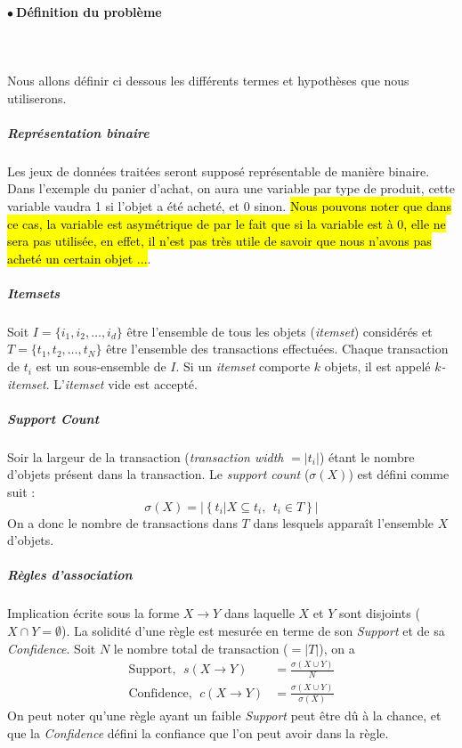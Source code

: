 \documentclass[letterpaper, 12pt]{article}
\newcommand{\alinea}{
\hspace*{0.5cm}}
\newcommand{\point}{$\bullet\ $}
\begin{document}
	\paragraph{\point Définition du problème}~\\~\\
		\alinea Nous allons définir ci dessous les différents
			termes et hypothèses que nous utiliserons.
		\subparagraph{Représentation binaire} Les jeux de données
			traitées seront supposé représentable de manière binaire.
			Dans l'exemple du panier d'achat, on aura une variable par
			type de produit, cette variable vaudra 1 si l'objet a été acheté,
			et 0 sinon. \hl{Nous pouvons noter que dans ce cas, la variable
			est asymétrique de par le fait que si la variable est à 0,
			elle ne sera pas utilisée, en effet, il n'est pas très utile 
			de savoir que nous n'avons pas acheté un certain objet ...}.
		\subparagraph{\textit{Itemsets}} Soit
			$I = \{i_1, i_2, \ldots, i_d\}$ être l'ensemble de tous 
			les objets (\textit{itemset}) considérés et 
			$T = \{t_1, t_2, \ldots, t_N\}$ être l'ensemble des transactions
			effectuées. Chaque transaction de $t_i$ est un sous-ensemble
			de $I$. Si un \textit{itemset} comporte $k$ objets, il est 
			appelé \textit{$k$-itemset}. L'\textit{itemset} vide est accepté.
		\subparagraph{\textit{Support Count}} Soir la largeur de la 
			transaction (\textit{transaction width} $= |t_i|$) étant le nombre
			d'objets présent dans la transaction. Le \textit{support count}
			($\sigma(X)$) est défini comme suit : 
			$$ \sigma(X) = |\left\lbrace t_i | X \subseteq t_i,\ \ t_i \in T
				\right\rbrace| $$
			On a donc le nombre de transactions dans $T$ dans lesquels
			apparaît l'ensemble $X$ d'objets.
		\subparagraph{Règles d'association} Implication écrite sous la forme
			$X \longrightarrow Y$ dans laquelle $X$ et $Y$ sont disjoints
			($X \cap Y = \emptyset$). La solidité d'une règle est
			mesurée en terme de son \textit{Support} et de sa
			\textit{Confidence}. Soit $N$ le nombre total de transaction
			($ = |T|$), on a 
			\begin{align*}
				\text{Support},\ \ s(X \longrightarrow Y) &= 
							\frac{\sigma(X \cup Y)}{N}\\
				\text{Confidence},\ \ c(X \longrightarrow Y) &= 
							\frac{\sigma(X \cup Y)}{\sigma(X)}
			\end{align*}
			On peut noter qu'une règle ayant un faible \textit{Support}
				peut être dû à la chance, et que la \textit{Confidence}
				défini la confiance que l'on peut avoir dans la règle.
\end{document}
